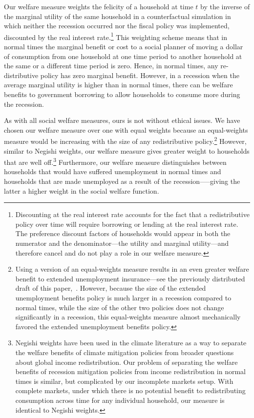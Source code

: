 \documentclass[qe]{econsocart}
\begin{document}
Our welfare measure weights the felicity of a household at time $t$ by the inverse of the marginal utility of the same household in a counterfactual simulation in which neither the recession occurred nor the fiscal policy was implemented, discounted by the real interest rate.\footnote{Discounting at the real interest rate accounts for the fact that a redistributive policy over time will require borrowing or lending at the real interest rate.
  The preference discount factors of households would appear in both the numerator and the denominator---the utility and marginal utility---and therefore cancel and do not play a role in our welfare measure.} This weighting scheme means that in normal times the marginal benefit or cost to a social planner of moving a dollar of consumption from one household at one time period to another household at the same or a different time period is zero.
Hence, in normal times, any re-distributive policy has zero marginal benefit.
However, in a recession when the average marginal utility is higher than in normal times, there can be welfare benefits to government borrowing to allow households to consume more during the recession.

As with all social welfare measures, ours is not without ethical issues.  We have chosen our welfare measure over one with equal weights because an equal-weights measure would be increasing with the size of any redistributive policy.\footnote{Using a version of an equal-weights measure results in an even greater welfare benefit to extended unemployment insurance---see the previously distributed draft of this paper,~\cite{carroll2023welfare}.  However, because the size of the extended unemployment benefits policy is much larger in a recession compared to normal times, while the size of the other two policies does not change significantly in a recession, this equal-weights measure almost mechanically favored the extended unemployment benefits policy.}  However, similar to Negishi weights, our welfare measure gives greater weight to households that are well off.\footnote{Negishi weights have been used in the climate literature as a way to separate the welfare benefits of climate mitigation policies from broader questions about global income redistribution. Our problem of separating the welfare benefits of recession mitigation policies from income redistribution in normal times is similar, but complicated by our incomplete markets setup. With complete markets, under which there is no potential benefit to redistributing consumption across time for any individual household, our measure is identical to Negishi weights.}  Furthermore, our welfare measure distinguishes between households that would have suffered unemployment in normal times and households that are made unemployed as a result of the recession—--giving the latter a higher weight in the social welfare function.
\end{document}
